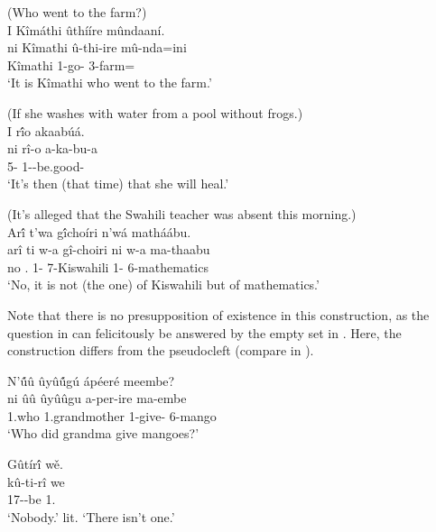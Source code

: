 \documentclass[output=paper]{langscibook}
\begin{document}
\ea
\label{bkm:Ref115935812}
(Who went to the farm?)\\
I Kîmáthi ûthííre mûndaaní.\\
\gll
ni  Kîmathi  û-thi-ire  mû-nda=ini\\
\FOC{} Kîmathi 1\RM{}-go-\PFV{} 3-farm=\LOC{}\\
\glt
‘It is Kîmathi who went to the farm.’

\z

\ea
\label{bkm:Ref111821091}
(If she washes with water from a pool without frogs.)\\
I r\'{î}o akaabú\'{a}.\\
\gll
ni  rî-o  a-ka-bu-a\\
\FOC{} 5-\PRO{} 1\SM-\FUT{}-be.good-\FV{}\\
\glt
‘It’s then (that time) that she will heal.’

\z

\ea
\label{bkm:Ref116896235}
(It’s alleged that the Swahili teacher was absent this morning.)\\
Ar\'{î} t’wa g\'{î}choíri n’wá matháábu.\\
\gll
arî  ti  w-a  gî-choiri  ni  w-a  ma-thaabu\\
no \NEG.\FOC{} 1-\CONN{} 7-Kiswahili \FOC{} 1-\CONN{} 6-mathematics\\
\glt
‘No, it is not (the one) of Kiswahili but of mathematics.’

\z


Note that there is no presupposition of existence in this construction, as the question in  can felicitously be answered by the empty set in . Here, the construction differs from the pseudocleft (compare in ).

\ea
\label{bkm:Ref111811743}
\ea
\label{bkm:Ref111811743:a}
N’\'{û}û ûyû\'{û}gú ápéeré meembe?\\
\gll
ni  ûû  ûyûûgu  a-per-ire  ma-embe\\
\FOC{} 1.who  1.grandmother 1\SM{}-give-\PFV{} 6-mango\\
\glt
‘Who did grandma give mangoes?’

\ex
\label{bkm:Ref111811743:b}
Gûtír\'{î} wě.\\
\gll
kû-ti-rî  we\\
17\SM-\NEG{}-be  1.\PRO{}\\
\glt
‘Nobody.’ lit. ‘There isn’t one.’
\end{document}

